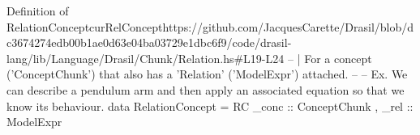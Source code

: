 \begin{haskell}{Definition of RelationConcept}{curRelConcept}{https://github.com/JacquesCarette/Drasil/blob/dc3674274edb00b1ae0d63e04ba03729e1dbc6f9/code/drasil-lang/lib/Language/Drasil/Chunk/Relation.hs\#L19-L24}
-- | For a concept ('ConceptChunk') that also has a 'Relation' ('ModelExpr') attached.
--
-- Ex. We can describe a pendulum arm and then apply an associated equation so that we know its behaviour.
data RelationConcept = RC { _conc :: ConceptChunk
                          , _rel  :: ModelExpr
                          }
\end{haskell}

